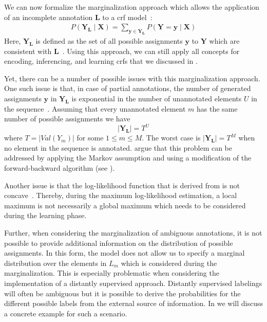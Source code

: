 We can now formalize the marginalization approach which allows the application of an incomplete annotation $\bm{L}$ to a \gls{crf} model~\citep{tsuboi2008training}:
\begin{equation}
  \label{equ:crf-marginalization}
  \begin{split}
    P\left(\bm{Y}_{\bm{L}}\mid\bm{X}\right)=\sum_{\bm{y}\in\bm{Y}_{\bm{L}}}P\left(\bm{Y}=\bm{y}\mid\bm{X}\right)
  \end{split}
\end{equation}
Here, $\bm{Y}_{\bm{L}}$ is defined as the set of all possible assignments $\bm{y}$ to $\bm{Y}$ which are consistent with $\bm{L}$~\citep{tsuboi2008training}.
Using this approach, we can still apply all concepts for encoding, inferencing, and learning \glspl{crf} that we discussed in .

\bigskip

Yet, there can be a number of possible issues with this marginalization approach.
One such issue is that, in case of partial annotations, the number of generated assignments $\bm{y}$ in $\bm{Y}_{\bm{L}}$ is exponential in the number of unannotated elements $U$ in the sequence~\citep{tsuboi2008training}.
Assuming that every unannotated element $m$ has the same number of possible assignments we have
\begin{equation}
  \label{equ:marginalization-number-of-assingments}
  |\bm{Y}_{\bm{L}}|=T^U
\end{equation}
where $T=|Val\left(Y_m\right)|$ for some $1\leq m\leq M$.
The worst case is $|\bm{Y}_{\bm{L}}|=T^M$ when no element in the sequence is annotated.
\citep{tsuboi2008training} argue that this problem can be addressed by applying the Markov assumption and using a modification of the forward-backward algorithm (see ).


Another issue is that the log-likelihood function that is derived from  is not concave~\citep{tsuboi2008training}.
Thereby, during the maximum log-likelihood estimation, a local maximum is not necessarily a global maximum which needs to be considered during the learning phase.

Further, when considering the marginalization of ambiguous annotations, it is not possible to provide additional information on the distribution of possible assignments.
In this form, the model does not allow us to specify a \gls{marginal distribution} over the elements in $L_m$ which is considered during the marginalization.
This is especially problematic when considering the implementation of a distantly supervised approach.
Distantly supervised labelings will often be ambiguous but it is possible to derive the probabilities for the different possible labels from the external source of information.
In  we will discuss a concrete example for such a scenario.

